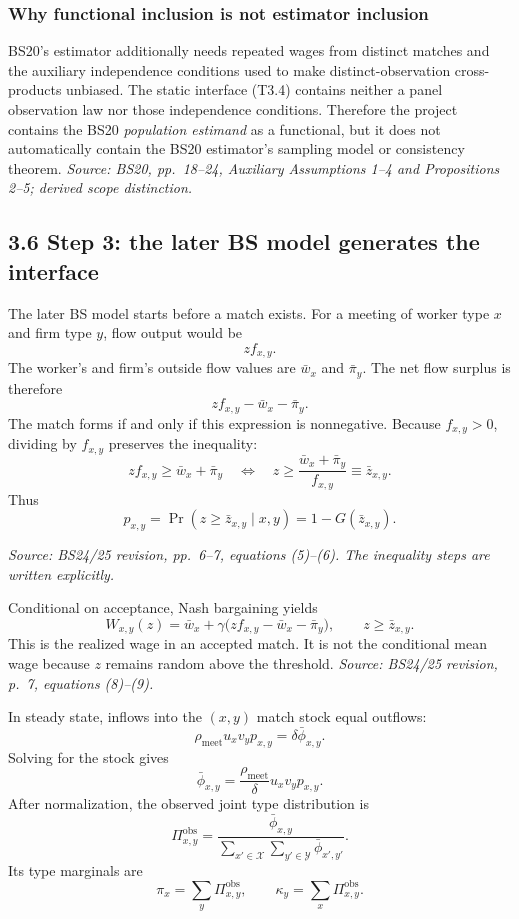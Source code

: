 \documentclass[11pt]{article}
\begin{document}
\subsubsection{Why functional inclusion is not estimator inclusion}

BS20's estimator additionally needs repeated wages from distinct matches and
the auxiliary independence conditions used to make distinct-observation
cross-products unbiased.  The static interface (T3.4) contains neither a
panel observation law nor those independence conditions.  Therefore the
project contains the BS20 \emph{population estimand} as a functional, but it
does not automatically contain the BS20 estimator's sampling model or
consistency theorem.
\textit{Source: BS20, pp.\ 18--24, Auxiliary Assumptions 1--4 and
Propositions 2--5; derived scope distinction.}

\subsection{3.6 Step 3: the later BS model generates the interface}

The later BS model starts before a match exists.  For a meeting of worker type
\(x\) and firm type \(y\), flow output would be
\[
zf_{x,y}.
\tag{T3.29}
\]
The worker's and firm's outside flow values are \(\bar w_x\) and
\(\bar\pi_y\).  The net flow surplus is therefore
\[
zf_{x,y}-\bar w_x-\bar\pi_y.
\tag{T3.30}
\]
The match forms if and only if this expression is nonnegative.  Because
\(f_{x,y}>0\), dividing by \(f_{x,y}\) preserves the inequality:
\[
zf_{x,y}\geq\bar w_x+\bar\pi_y
\quad\Longleftrightarrow\quad
z\geq
\frac{\bar w_x+\bar\pi_y}{f_{x,y}}
\equiv\bar z_{x,y}.
\tag{T3.31}
\]
Thus
\[
p_{x,y}
=
\Pr(z\geq\bar z_{x,y}\mid x,y)
=
1-G(\bar z_{x,y}).
\tag{T3.32}
\]

\textit{Source: BS24/25 revision, pp.\ 6--7, equations (5)--(6).  The
inequality steps are written explicitly.}

Conditional on acceptance, Nash bargaining yields
\[
W_{x,y}(z)
=
\bar w_x
+\gamma\bigl(zf_{x,y}-\bar w_x-\bar\pi_y\bigr),
\qquad z\geq\bar z_{x,y}.
\tag{T3.33}
\]
This is the realized wage in an accepted match.  It is not the conditional
mean wage because \(z\) remains random above the threshold.
\textit{Source: BS24/25 revision, p.\ 7, equations (8)--(9).}

In steady state, inflows into the \((x,y)\) match stock equal outflows:
\[
\rho_{\mathrm{meet}}u_xv_yp_{x,y}
=
\delta\bar\phi_{x,y}.
\tag{T3.34}
\]
Solving for the stock gives
\[
\bar\phi_{x,y}
=
\frac{\rho_{\mathrm{meet}}}{\delta}
u_xv_yp_{x,y}.
\tag{T3.35}
\]
After normalization, the observed joint type distribution is
\[
\Pi^{\mathrm{obs}}_{x,y}
=
\frac{\bar\phi_{x,y}}
{\sum_{x'\in\mathcal X}\sum_{y'\in\mathcal Y}
\bar\phi_{x',y'}}.
\tag{T3.36}
\]
Its type marginals are
\[
\pi_x=\sum_y\Pi^{\mathrm{obs}}_{x,y},
\qquad
\kappa_y=\sum_x\Pi^{\mathrm{obs}}_{x,y}.
\tag{T3.36a}
\]
\end{document}
